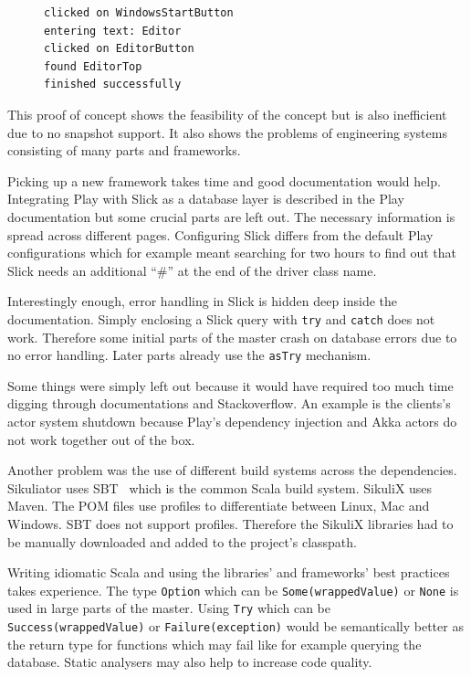 \documentclass[a4paper,twocolumn,twoside]{article}
\newcommand{\Sik}[0]{Sikuliator}
\begin{document}
\begin{figure}
\begin{lstlisting}[caption={Sikuliator's output for the example test case},label={lst:EditorOutput}]
clicked on WindowsStartButton
entering text: Editor
clicked on EditorButton
found EditorTop
finished successfully
\end{lstlisting}
\end{figure}
This proof of concept shows the feasibility of the concept but is also inefficient due to no snapshot support.
It also shows the problems of engineering systems consisting of many parts and frameworks.

Picking up a new framework takes time and good documentation would help.
Integrating Play with Slick as a database layer is described in the Play documentation but some crucial parts are left out.
The necessary information is spread across different pages.
Configuring Slick differs from the default Play configurations which for example meant searching for two hours to find out that Slick needs an additional \enquote{\#} at the end of the driver class name.

Interestingly enough, error handling in Slick is hidden deep inside the documentation.
Simply enclosing a Slick query with \texttt{try} and \texttt{catch} does not work.
Therefore some initial parts of the master crash on database errors due to no error handling.
Later parts already use the \texttt{asTry} mechanism.

Some things were simply left out because it would have required too much time digging through documentations and Stackoverflow. An example is the clients's actor system shutdown because Play's dependency injection and Akka actors do not work together out of the box.

Another problem was the use of different build systems across the dependencies.
\Sik{} uses SBT~\cite{SBT} which is the common Scala build system.
SikuliX uses Maven.
The POM files use profiles to differentiate between Linux, Mac and Windows.
SBT does not support profiles.
Therefore the SikuliX libraries had to be manually downloaded and added to the project's classpath.

Writing idiomatic Scala and using the libraries' and frameworks' best practices takes experience.
The type \texttt{Option} which can be \texttt{Some(wrappedValue)} or \texttt{None} is used in large parts of the master.
Using \texttt{Try} which can be \texttt{Success(wrappedValue)} or \texttt{Failure(exception)} would be semantically better as the return type for functions which may fail like for example querying the database.
Static analysers may also help to increase code quality.
\end{document}
